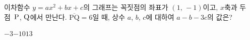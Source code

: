 이차함수 $y=ax^2+bx+c$의 그래프는 꼭짓점의 좌표가 $(1,\,-1)$이고, $x$축과 두 점~$\mathrm{P}$, $\mathrm{Q}$에서 만난다. $\overline{\mathrm{PQ}}=6$일 때, 상수 $a$, $b$, $c$에 대하여 $a-b-3c$의 값은?
\begin{choices32}{$-3$}{$-1$}{$0$}{$1$}{$3$}\end{choices32}
